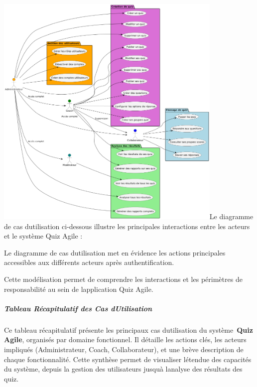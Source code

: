 \documentclass[12pt,a4paper,twoside]{report}
\begin{document}
\includegraphics[width=4.30069in,height=4.50069in]{latex_media/media/image14.png}Le
diagramme de cas d\textquotesingle utilisation ci-dessous illustre les
principales interactions entre les acteurs et le système Quiz Agile :

Le diagramme de cas d\textquotesingle utilisation met en évidence les
actions principales accessibles aux différents acteurs après
authentification.

Cette modélisation permet de comprendre les interactions et les
périmètres de responsabilité au sein de l\textquotesingle application
Quiz Agile.

\hypertarget{tableau-ruxe9capitulatif-des-cas-dutilisation}{%
\subparagraph{Tableau Récapitulatif des Cas
d\textquotesingle Utilisation}\label{tableau-ruxe9capitulatif-des-cas-dutilisation}}

Ce tableau récapitulatif présente les principaux cas
d\textquotesingle utilisation du système~\textbf{Quiz Agile}, organisés
par domaine fonctionnel. Il détaille les actions clés, les acteurs
impliqués (Administrateur, Coach, Collaborateur), et une brève
description de chaque fonctionnalité. Cette synthèse permet de
visualiser l\textquotesingle étendue des capacités du système, depuis la
gestion des utilisateurs jusqu\textquotesingle à
l\textquotesingle analyse des résultats des quiz.
\end{document}
